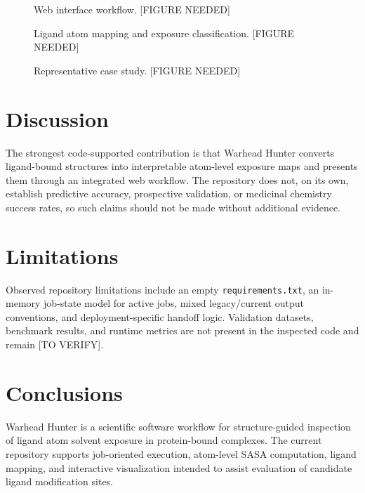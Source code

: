 \documentclass[11pt]{article}
\begin{document}
\begin{figure}[htbp]
  \centering
  \caption{Web interface workflow. [FIGURE NEEDED]}
  \label{fig:web}
\end{figure}

\begin{figure}[htbp]
  \centering
  \caption{Ligand atom mapping and exposure classification. [FIGURE NEEDED]}
  \label{fig:mapping}
\end{figure}

\begin{figure}[htbp]
  \centering
  \caption{Representative case study. [FIGURE NEEDED]}
  \label{fig:case}
\end{figure}

\section{Discussion}
The strongest code-supported contribution is that Warhead Hunter converts ligand-bound structures into interpretable atom-level exposure maps and presents them through an integrated web workflow. The repository does not, on its own, establish predictive accuracy, prospective validation, or medicinal chemistry success rates, so such claims should not be made without additional evidence.

\section{Limitations}
Observed repository limitations include an empty \texttt{requirements.txt}, an in-memory job-state model for active jobs, mixed legacy/current output conventions, and deployment-specific handoff logic. Validation datasets, benchmark results, and runtime metrics are not present in the inspected code and remain [TO VERIFY].

\section{Conclusions}
Warhead Hunter is a scientific software workflow for structure-guided inspection of ligand atom solvent exposure in protein-bound complexes. The current repository supports job-oriented execution, atom-level SASA computation, ligand mapping, and interactive visualization intended to assist evaluation of candidate ligand modification sites.
\end{document}
